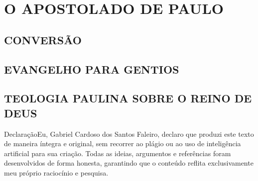 \documentclass[
    article,            %
	12pt,				%
	oneside,			%
	a4paper,			%
	chapter=TITLE,		%
	section=TITLE,		%
	english,			%
	french,				%
	spanish,			%
	brazil				%
	]{abntex2}
\begin{document}
\section{O APOSTOLADO DE PAULO}
\subsection{CONVERSÃO}
\subsection{EVANGELHO PARA GENTIOS}
\subsection{TEOLOGIA PAULINA SOBRE O REINO DE DEUS}

\pagebreak
\noindent Declaração\linebreak Eu, Gabriel Cardoso dos Santos Faleiro, declaro que produzi este texto de maneira íntegra e original, sem recorrer ao plágio ou ao uso de inteligência artificial para sua criação. Todas as ideias, argumentos e referências foram desenvolvidos de forma honesta, garantindo que o conteúdo reflita exclusivamente meu próprio raciocínio e pesquisa.
\pagebreak
\renewcommand{\bibname}{{REFER\^ENCIAS}}

\end{document}
